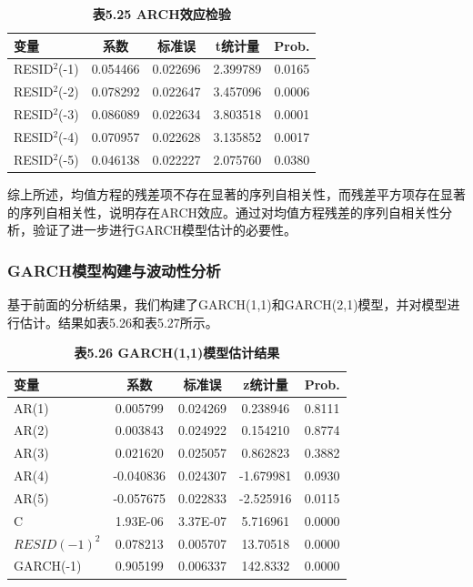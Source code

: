 \documentclass[12pt, a4paper]{article}
\numberwithin{equation}{section}
\begin{document}
\begin{table}[h!]
    \centering
    \captionsetup{labelformat=empty}
    \caption{\textbf{\fontsize{9pt}{11pt}\selectfont 表5.25 ARCH效应检验}}
    \begin{tabular}{lcccc}
        \toprule
        变量            & 系数       & 标准误      & t统计量     & Prob.  \\
        \midrule
        RESID$^2$(-1) & 0.054466 & 0.022696 & 2.399789 & 0.0165 \\
        RESID$^2$(-2) & 0.078292 & 0.022647 & 3.457096 & 0.0006 \\
        RESID$^2$(-3) & 0.086089 & 0.022634 & 3.803518 & 0.0001 \\
        RESID$^2$(-4) & 0.070957 & 0.022628 & 3.135852 & 0.0017 \\
        RESID$^2$(-5) & 0.046138 & 0.022227 & 2.075760 & 0.0380 \\
        \bottomrule
    \end{tabular}
\end{table}

综上所述，均值方程的残差项不存在显著的序列自相关性，而残差平方项存在显著的序列自相关性，说明存在ARCH效应。通过对均值方程残差的序列自相关性分析，验证了进一步进行GARCH模型估计的必要性。

\subsubsection{GARCH模型构建与波动性分析}

基于前面的分析结果，我们构建了GARCH(1,1)和GARCH(2,1)模型，并对模型进行估计。结果如表5.26和表5.27所示。

\begin{table}[h!]
    \centering
    \captionsetup{labelformat=empty}
    \caption{\textbf{\fontsize{9pt}{11pt}\selectfont 表5.26 GARCH(1,1)模型估计结果}}
    \begin{tabular}{lcccc}
        \toprule
        变量            & 系数        & 标准误      & z统计量      & Prob.  \\
        \midrule
        AR(1)         & 0.005799  & 0.024269 & 0.238946  & 0.8111 \\
        AR(2)         & 0.003843  & 0.024922 & 0.154210  & 0.8774 \\
        AR(3)         & 0.021620  & 0.025057 & 0.862823  & 0.3882 \\
        AR(4)         & -0.040836 & 0.024307 & -1.679981 & 0.0930 \\
        AR(5)         & -0.057675 & 0.022833 & -2.525916 & 0.0115 \\
        C             & 1.93E-06  & 3.37E-07 & 5.716961  & 0.0000 \\
        $RESID(-1)^2$ & 0.078213  & 0.005707 & 13.70518  & 0.0000 \\
        GARCH(-1)     & 0.905199  & 0.006337 & 142.8332  & 0.0000 \\
        \bottomrule
    \end{tabular}
\end{table}
\end{document}
